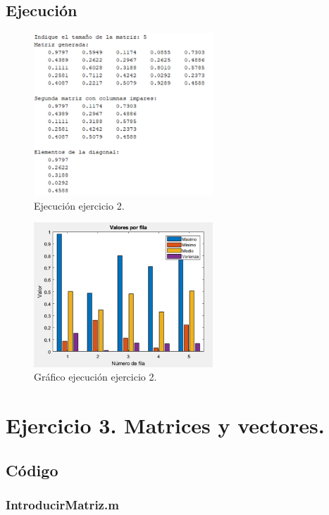 \documentclass[a4paper, 12pt]{article}
\begin{document}
	\subsection{Ejecución}
	\begin{figure}[htp!]
		\centering
		\includegraphics[width=0.6\textwidth]{figures/ejc2.png}
		\caption{Ejecución ejercicio 2.}
	\end{figure}
	\begin{figure}[htp!]
		\centering
		\includegraphics[width=0.6\textwidth]{figures/graf1.png}
		\caption{Gráfico ejecución ejercicio 2.}
	\end{figure}
	
	\section{Ejercicio 3. Matrices y vectores.}
	
	\subsection{Código}
	\subsubsection*{IntroducirMatriz.m}
	\inputminted[fontsize=\scriptsize, linenos, breaklines=true, xleftmargin=0.75cm, frame=lines]{matlab}{code/IntroducirMatriz.m}
	\inputminted[fontsize=\scriptsize, linenos, breaklines=true, xleftmargin=0.75cm, frame=lines]{matlab}{code/Ejercicio3.m}
\end{document}

